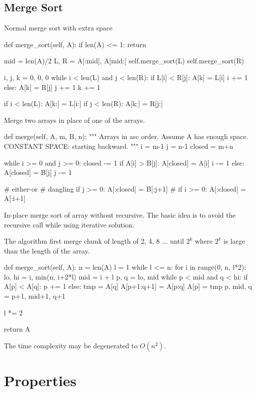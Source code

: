 \subsection{Merge Sort}
 Normal merge sort with extra space
\begin{python}
def merge_sort(self, A):
  if len(A) <= 1:
    return

  mid = len(A)/2
  L, R = A[:mid], A[mid:]
  self.merge_sort(L)
  self.merge_sort(R)

  i, j, k = 0, 0, 0
  while i < len(L) and j < len(R):
    if L[i] < R[j]:
      A[k] = L[i]
      i += 1
    else:
      A[k] = R[j]
      j += 1
    k += 1

  if i < len(L):
    A[k:] = L[i:]
  if j < len(R):
    A[k:] = R[j:]
\end{python}

 Merge two arrays in place of one of the arrays.  
\begin{python}
def merge(self, A, m, B, n):
  """
  Arrays in asc order.
  Assume A has enough space.
  CONSTANT SPACE: starting backward. 
  """
  i = m-1
  j = n-1
  closed = m+n

  while i >= 0 and j >= 0:
    closed -= 1
    if A[i] > B[j]:
      A[closed] = A[i]
      i -= 1
    else:
      A[closed] = B[j]
      j -= 1

  # either-or
  # dangling
  if j >= 0: A[:closed] = B[:j+1]
  # if i >= 0: A[:closed] = A[:i+1]
\end{python}
In-place merge sort of array without recursive. The basic idea is to avoid the recursive call while using iterative solution.

The algorithm first merge chunk of length of 2, 4, 8 ... until $2^k$ where $2^k$ is large than the length of the array.
\begin{python}
def merge_sort(self, A):
  n = len(A)
  l = 1
  while l <= n:
    for i in range(0, n, l*2):
      lo, hi = i, min(n, i+2*l)
      mid = i + l
      p, q = lo, mid
      while p < mid and q < hi:
        if A[p] < A[q]:
          p += 1
        else:
          tmp = A[q]
          A[p+1:q+1] = A[p:q]
          A[p] = tmp
          p, mid, q = p+1, mid+1, q+1

    l *= 2

  return A
\end{python}
The time complexity may be degenerated to $O(n^2)$. 
\section{Properties}
